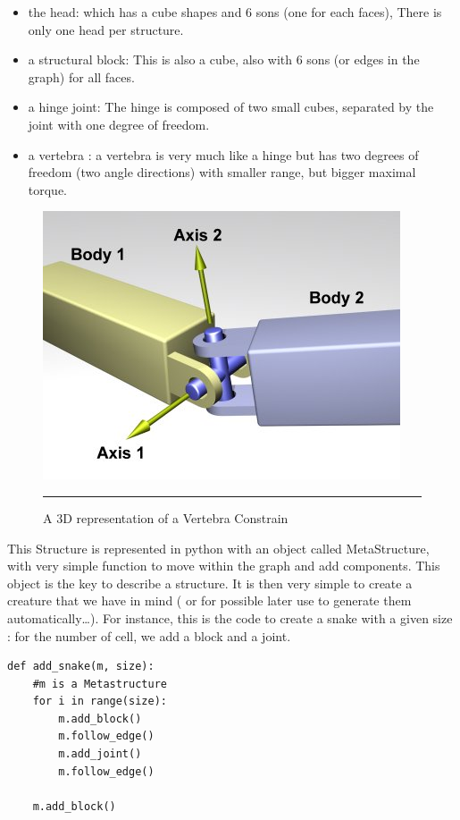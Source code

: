 \begin{itemize}
    \item the head: which has a cube shapes and 6 sons (one for each faces), There is only one head per structure.
    \item a structural block: This is also a cube, also with 6 sons (or edges in the graph) for all faces.
    \item a hinge joint: The hinge is composed of two small cubes, separated by the joint with one degree of freedom.
    \item a vertebra : a vertebra is very much like a hinge but has two degrees of freedom (two angle directions) with smaller range, but bigger maximal torque.
\end{itemize}

\begin{figure}[htbp]
    \centering
    \includegraphics[scale=2.0]{Figures/vertebra.jpg}
    \rule{35em}{0.5pt}
    \caption[A Vertebra Constraint]{A 3D representation of a Vertebra Constrain}
    \label{fig:Vertebra}
\end{figure}



This Structure is represented in python with an object called MetaStructure, with very simple function to move within the graph and add components. This object is the key to describe a structure. It is then very simple to create a creature that we have in mind ( or for possible later use to generate them automatically\ldots). For instance, this is the code to create a snake with a given size : for the number of cell, we add a block and a joint. 

\begin{verbatim}
def add_snake(m, size):
    #m is a Metastructure
    for i in range(size):
        m.add_block()
        m.follow_edge()
        m.add_joint()
        m.follow_edge()
    
    m.add_block()
\end{verbatim}


